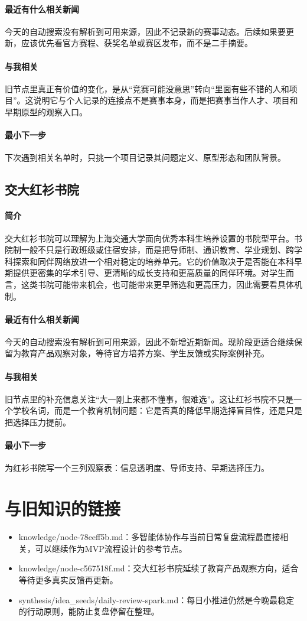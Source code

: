 \documentclass[UTF8,zihao=-4]{ctexart}
\begin{document}
\paragraph{最近有什么相关新闻} 今天的自动搜索没有解析到可用来源，因此不记录新的赛事动态。后续如果要更新，应该优先看官方赛程、获奖名单或赛区发布，而不是二手摘要。
\paragraph{与我相关} 旧节点里真正有价值的变化，是从“竞赛可能没意思”转向“里面有些不错的人和项目”。这说明它与个人记录的连接点不是赛事本身，而是把赛事当作人才、项目和早期原型的观察入口。
\paragraph{最小下一步} 下次遇到相关名单时，只挑一个项目记录其问题定义、原型形态和团队背景。
\subsection*{交大红衫书院}
\paragraph{简介} 交大红衫书院可以理解为上海交通大学面向优秀本科生培养设置的书院型平台。书院制一般不只是行政班级或住宿安排，而是把导师制、通识教育、学业规划、跨学科探索和同伴网络放进一个相对稳定的培养单元。它的价值取决于是否能在本科早期提供更密集的学术引导、更清晰的成长支持和更高质量的同伴环境。对学生而言，这类书院可能带来机会，也可能带来更早筛选和更高压力，因此需要看具体机制。
\paragraph{最近有什么相关新闻} 今天的自动搜索没有解析到可用来源，因此不新增近期新闻。现阶段更适合继续保留为教育产品观察对象，等待官方培养方案、学生反馈或实际案例补充。
\paragraph{与我相关} 旧节点里的补充信息关注“大一刚上来都不懂事，很难选”。这让红衫书院不只是一个学校名词，而是一个教育机制问题：它是否真的降低早期选择盲目性，还是只是把选择压力提前。
\paragraph{最小下一步} 为红衫书院写一个三列观察表：信息透明度、导师支持、早期选择压力。
\section*{与旧知识的链接}
\begin{itemize}[leftmargin=2em]
\item knowledge/node-78eeff5b.md：多智能体协作与当前日常复盘流程最直接相关，可以继续作为MVP流程设计的参考节点。
\item knowledge/node-c567518f.md：交大红衫书院延续了教育产品观察方向，适合等待更多真实反馈再更新。
\item synthesis/idea\_seeds/daily-review-spark.md：每日小推进仍然是今晚最稳定的行动原则，能防止复盘停留在整理。
\end{itemize}
\end{document}

